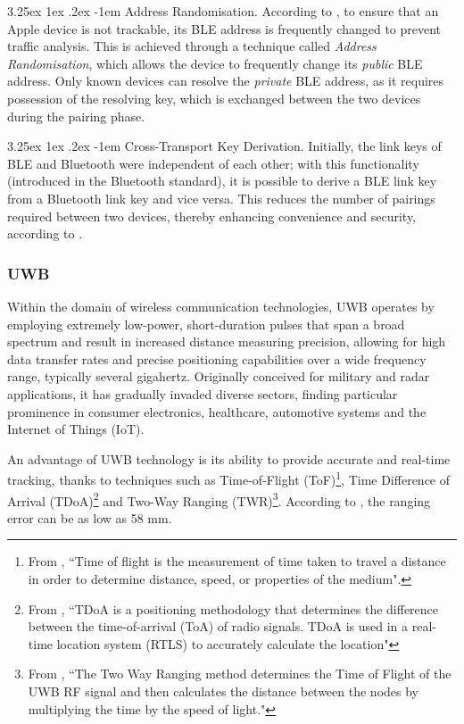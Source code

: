 \documentclass[english]{article}
\makeatletter
\newcounter{subsubsubsection}[subsubsection]
\renewcommand\paragraph{\@startsection{paragraph}{5}{\z@}%
  {3.25ex \@plus1ex \@minus.2ex}%
  {-1em}%
  {\normalfont\normalsize\bfseries}}
\makeatother
\begin{document}
\paragraph{Address Randomisation.}\label{random} According to \cite{aps}, to ensure that an Apple device is not trackable, its BLE address is frequently changed to prevent traffic analysis. This is achieved through a technique called \textit{Address Randomisation}, which allows the device to frequently change its \textit{public} BLE address. Only known devices can resolve the \textit{private} BLE address, as it requires possession of the resolving key, which is exchanged between the two devices during the pairing phase.

\paragraph{Cross-Transport Key Derivation.}
Initially, the link keys of BLE and Bluetooth were independent of each other; with this functionality (introduced in the Bluetooth standard), it is possible to derive a BLE link key from a Bluetooth link key and vice versa. This reduces the number of pairings required between two devices, thereby enhancing convenience and security, according to \cite{antonioli2022blurtooth}.

\subsubsection{UWB}\label{sec:uwb}
Within the domain of wireless communication technologies, UWB operates by employing extremely low-power, short-duration pulses that span a broad spectrum and result in increased distance measuring precision, allowing for high data transfer rates and precise positioning capabilities over a wide frequency range, typically several gigahertz. Originally conceived for military and radar applications, it has gradually invaded diverse sectors, finding particular prominence in consumer electronics, healthcare, automotive systems and the Internet of Things (IoT).

An advantage of UWB technology is its ability to provide accurate and real-time tracking, thanks to techniques such as Time-of-Flight (ToF)\footnote{From \cite{tof}, ``Time of flight is the measurement of time taken to travel a distance in order to determine distance, speed, or properties of the medium".}, Time Difference of Arrival (TDoA)\footnote{From \cite{tdoa}, ``TDoA is a positioning methodology that determines the difference between the time-of-arrival (ToA) of radio signals. TDoA is used in a real-time location system (RTLS) to accurately calculate the location"} and Two-Way Ranging (TWR)\footnote{From \cite{twr}, ``The Two Way Ranging method determines the Time of Flight of the UWB RF signal and then calculates the distance between the nodes by multiplying the time by the speed of light."}. According to \cite{article}, the ranging error can be as low as 58 mm.
\end{document}
